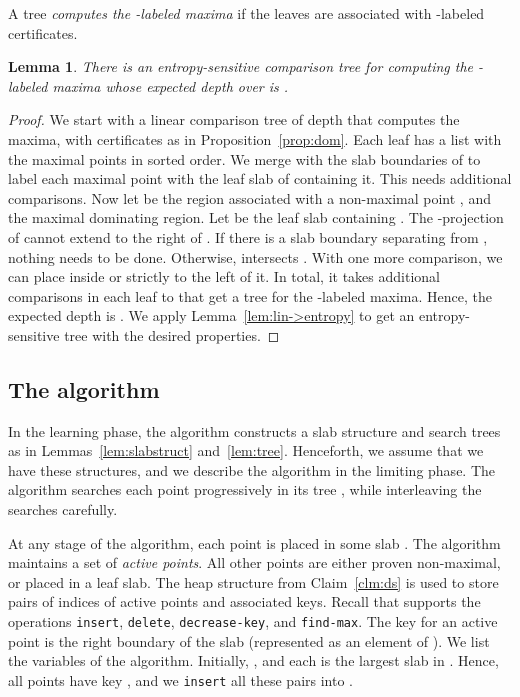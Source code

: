 \documentclass[letterpaper,11pt]{article}
\newtheorem{lemma}[theorem]{Lemma}
\newcommand{\findmax}{\texttt{find-max}}
\newcommand{\ins}{\texttt{insert}}
\newcommand{\delete}{\texttt{delete}}
\newcommand{\deckey}{\texttt{decrease-key}}
\begin{document}
A tree  \emph{computes the -labeled
maxima} if the leaves are associated with 
-labeled certificates.

\begin{lemma}\label{lem:comp} 
  There is an entropy-sensitive comparison 
  tree  for computing the -labeled 
  maxima whose expected depth over  is 
  .
\end{lemma}

\begin{proof} 
We start with a linear comparison 
tree of depth  that computes the maxima, with
certificates as in 
Proposition~\ref{prop:dom}. 
Each leaf has a list  with the maximal
points in sorted order.  We merge  with the 
slab boundaries of  to label each 
maximal point with the leaf slab of  containing it. 
This needs  additional comparisons.
Now let  be the region associated 
with a non-maximal point , and  
the maximal dominating region. Let  
be the leaf slab containing .
The -projection of  cannot extend 
to the right of .
If there is a slab boundary separating 
 from , nothing needs to be done.
Otherwise,  intersects 
. With one more comparison, we can
place  inside  or strictly 
to the left of it.
In total, it takes  additional 
comparisons in each leaf to
that get a tree for the -labeled 
maxima. Hence, the expected depth is . 
We apply Lemma~\ref{lem:lin->entropy} 
to get an entropy-sensitive tree with
the desired properties.
\end{proof}

\subsection{The algorithm}
\label{sec:algorithm}

In the learning phase, the algorithm 
constructs a slab structure  and
search trees  as in 
Lemmas~\ref{lem:slabstruct} and~\ref{lem:tree}.
Henceforth, we assume that we have these structures, 
and we describe the algorithm in the limiting
phase.
The algorithm searches
each point  progressively 
in its tree , while
interleaving
the searches carefully. 

At any stage of the algorithm, 
each point  is placed in some slab 
.  The algorithm maintains a set 
 of \emph{active points}. All
other points are either proven 
non-maximal, or placed in 
a leaf slab. 
The heap structure  from
Claim~\ref{clm:ds} is used to
store pairs of indices of active points
and associated keys.
Recall that  supports the operations \ins{},
\delete{}, \deckey{}, and \findmax{}. The key 
for an active point  is the  
right boundary of the slab  
(represented as an element of ).
We list the variables of the algorithm.
Initially, , and each  is the largest 
slab in .  Hence, all points have  key , 
and we \ins{} all these pairs
into . 
\end{document}
